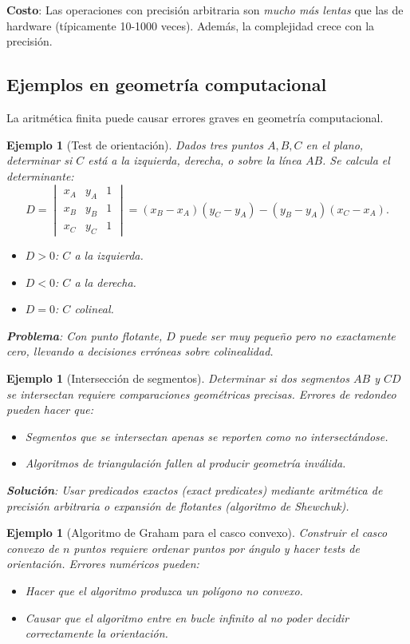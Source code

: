 \documentclass[a4paper,11pt]{report}
\newtheorem{example}[theorem]{Ejemplo}
\begin{document}
\textbf{Costo}: Las operaciones con precisión arbitraria son \textit{mucho más lentas} que las de hardware (típicamente 10-1000 veces). Además, la complejidad crece con la precisión.

\subsection{Ejemplos en geometría computacional}

La aritmética finita puede causar errores graves en geometría computacional.

\begin{example}[Test de orientación]
Dados tres puntos $A, B, C$ en el plano, determinar si $C$ está a la izquierda, derecha, o sobre la línea $AB$. Se calcula el determinante:
\[
D = \begin{vmatrix}
x_A & y_A & 1 \\
x_B & y_B & 1 \\
x_C & y_C & 1
\end{vmatrix} = (x_B - x_A)(y_C - y_A) - (y_B - y_A)(x_C - x_A).
\]
\begin{itemize}
\item $D > 0$: $C$ a la izquierda.
\item $D < 0$: $C$ a la derecha.
\item $D = 0$: $C$ colineal.
\end{itemize}

\textbf{Problema}: Con punto flotante, $D$ puede ser muy pequeño pero no exactamente cero, llevando a decisiones erróneas sobre colinealidad.
\end{example}

\begin{example}[Intersección de segmentos]
Determinar si dos segmentos $AB$ y $CD$ se intersectan requiere comparaciones geométricas precisas. Errores de redondeo pueden hacer que:
\begin{itemize}
\item Segmentos que se intersectan apenas se reporten como no intersectándose.
\item Algoritmos de triangulación fallen al producir geometría inválida.
\end{itemize}

\textbf{Solución}: Usar \textit{predicados exactos} (exact predicates) mediante aritmética de precisión arbitraria o expansión de flotantes (algoritmo de Shewchuk).
\end{example}

\begin{example}[Algoritmo de Graham para el casco convexo]
Construir el casco convexo de $n$ puntos requiere ordenar puntos por ángulo y hacer tests de orientación. Errores numéricos pueden:
\begin{itemize}
\item Hacer que el algoritmo produzca un polígono no convexo.
\item Causar que el algoritmo entre en bucle infinito al no poder decidir correctamente la orientación.
\end{itemize}
\end{example}
\end{document}
